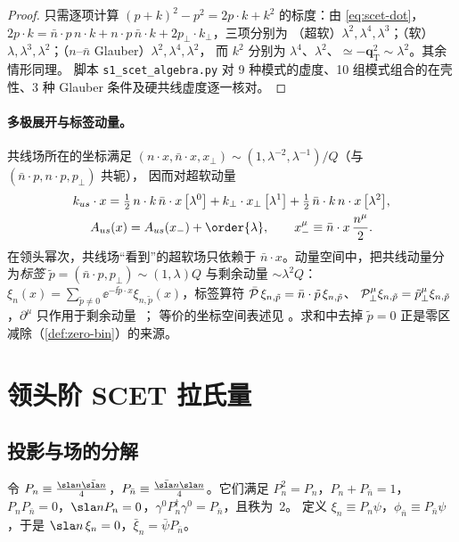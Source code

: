 \begin{proof}
只需逐项计算 $(p+k)^2-p^2=2p\cdot k+k^2$ 的标度：由 \cref{eq:scet-dot}，
$2p\cdot k=\bar n\cdot p\,n\cdot k+n\cdot p\,\bar n\cdot k+2p_\perp\cdot k_\perp$，三项分别为
（超软）$\lambda^2,\lambda^4,\lambda^3$；（软）$\lambda,\lambda^3,\lambda^2$；（$n$–$\bar n$ Glauber）$\lambda^2,\lambda^4,\lambda^2$，
而 $k^2$ 分别为 $\lambda^4$、$\lambda^2$、$\simeq-\bm q_{\mathrm T}^2\sim\lambda^2$。其余情形同理。
脚本 \texttt{s1\_\allowbreak scet\_\allowbreak algebra.py} 对 9 种模式的虚度、10 组模式组合的在壳性、3 种 Glauber 条件及硬共线虚度逐一核对。
\end{proof}

\paragraph{多极展开与标签动量。}
共线场所在的坐标满足 $(n\cdot x,\bar n\cdot x,x_\perp)\sim(1,\lambda^{-2},\lambda^{-1})/Q$（与 $(\bar n\cdot p,n\cdot p,p_\perp)$ 共轭），
因而对超软动量
\begin{equation}\label{eq:scet-multipole}
\begin{gathered}
k_{us}\cdot x=\tfrac12\,n\cdot k\,\bar n\cdot x\,\big[\lambda^0\big]+k_\perp\cdot x_\perp\,\big[\lambda^1\big]
+\tfrac12\,\bar n\cdot k\,n\cdot x\,\big[\lambda^2\big],\\
A_{us}(x)=A_{us}(x_-)+\order{\lambda},\qquad x_-^\mu\equiv\bar n\cdot x\,\frac{n^\mu}{2}.
\end{gathered}
\end{equation}
在领头幂次，共线场“看到”的超软场只依赖于 $\bar n\cdot x$。动量空间中，把共线动量分为\emph{标签}
$\tilde p=(\bar n\cdot p,p_\perp)\sim(1,\lambda)Q$ 与剩余动量 $\sim\lambda^2Q$：
$\xi_n(x)=\sum_{\tilde p\neq0}\ee^{-\ii\tilde p\cdot x}\xi_{n,\tilde p}(x)$，标签算符 $\bar{\mathcal P}\,\xi_{n,\tilde p}=\bar n\cdot\tilde p\,\xi_{n,\tilde p}$、
$\mathcal P_{\perp}^\mu\xi_{n,\tilde p}=\tilde p_\perp^\mu\xi_{n,\tilde p}$，$\partial^\mu$ 只作用于剩余动量~\cite{BauerEtAl2001,BauerStewart2001}；
等价的坐标空间表述见 \cite{BenekeEtAl2002}。求和中去掉 $\tilde p=0$ 正是零区减除（\cref{def:zero-bin}）的来源。

\section{领头阶 SCET 拉氏量}\label{sec:scet-lagrangian}

\subsection{投影与场的分解}
令 $P_n\equiv\frac{\nslash\nbslash}{4}$，$P_{\bar n}\equiv\frac{\nbslash\nslash}{4}$。它们满足
$P_n^2=P_n$，$P_n+P_{\bar n}=1$，$P_nP_{\bar n}=0$，$\nslash P_n=0$，$\gamma^0P_n^\dagger\gamma^0=P_{\bar n}$，且秩为~2。
定义 $\xi_n\equiv P_n\psi$，$\phi_{\bar n}\equiv P_{\bar n}\psi$，于是 $\nslash\,\xi_n=0$，$\bar\xi_n=\bar\psi P_{\bar n}$。

